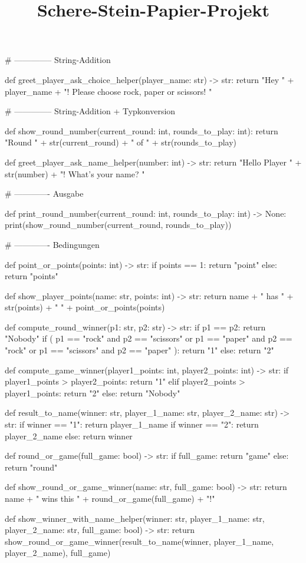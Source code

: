 \documentclass[a4paper, DIV = calc]{scrartcl}
\title{Schere-Stein-Papier-Projekt}
\date{}
\newcommand{\expandpyconc}[1]{\expandafter\reallyexpandpyconc\expandafter{#1}}
\newcommand{\reallyexpandpyconc}[1]{\pyconc{exec(compile(open('#1', 'rb').read(), '#1', 'exec'))}}
\newenvironment{pyconcodeblck}[1]
{\newcommand{\snippetfile}{snippet-#1.py}
	\VerbatimEnvironment
	\begin{VerbatimOut}{\snippetfile}}
	{\end{VerbatimOut}
	\expandpyconc{\snippetfile}}
\begin{document}
\begin{pyconcodeblck}{rps}
# -------------- String-Addition

def greet_player_ask_choice_helper(player_name: str) -> str:
    return "Hey " + player_name + "! Please choose rock, paper or scissors! "


# -------------- String-Addition + Typkonversion


def show_round_number(current_round: int, rounds_to_play: int):
    return "Round " + str(current_round) + " of " + str(rounds_to_play)


def greet_player_ask_name_helper(number: int) -> str:
    return "Hello Player " + str(number) + "! What's your name? "


# ------------- Ausgabe

def print_round_number(current_round: int, rounds_to_play: int) -> None:
    print(show_round_number(current_round, rounds_to_play))


# ------------- Bedingungen

def point_or_points(points: int) -> str:
    if points == 1:
        return "point"
    else:
        return "points"


def show_player_points(name: str, points: int) -> str:
    return name + " has " + str(points) + " " + point_or_points(points)


def compute_round_winner(p1: str, p2: str) -> str:
    if p1 == p2:
        return "Nobody"
    if (
        p1 == "rock"
        and p2 == "scissors"
        or p1 == "paper"
        and p2 == "rock"
        or p1 == "scissors"
        and p2 == "paper"
    ):
        return "1"
    else:
        return "2"


def compute_game_winner(player1_points: int, player2_points: int) -> str:
    if player1_points > player2_points:
        return "1"
    elif player2_points > player1_points:
        return "2"
    else:
        return "Nobody"


def result_to_name(winner: str, player_1_name: str, player_2_name: str) -> str:
    if winner == "1":
        return player_1_name
    if winner == "2":
        return player_2_name
    else:
        return winner


def round_or_game(full_game: bool) -> str:
    if full_game:
        return "game"
    else:
        return "round"

def show_round_or_game_winner(name: str, full_game: bool) -> str:
    return name + " wins this " + round_or_game(full_game) + "!"


def show_winner_with_name_helper(winner: str, player_1_name: str, player_2_name: str, full_game: bool) -> str:
    return show_round_or_game_winner(result_to_name(winner, player_1_name, player_2_name), full_game)


\end{pyconcodeblck}
\end{document}
